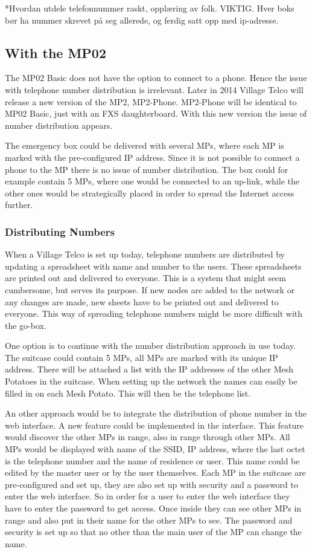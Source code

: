 *Hvordan utdele telefonnummer raskt, opplæring av folk. VIKTIG. Hver boks bør ha nummer skrevet på seg allerede, og ferdig satt opp med ip-adresse. 


\subsection{With the MP02}
The MP02 Basic does not have the option to connect to a phone. Hence the issue with telephone number distribution is irrelevant. Later in 2014 Village Telco will release a new version of the MP2, MP2-Phone. MP2-Phone will be identical to MP02 Basic, just with an FXS daughterboard. With this new version the issue of number distribution appears. 

The emergency box could be delivered with several MPs, where each MP is marked with the pre-configured IP address. Since it is not possible to connect a phone to the MP there is no issue of number distribution. The box could for example contain 5 MPs, where one would be connected to an up-link, while the other ones would be strategically placed in order to spread the Internet access further. 

\subsubsection{Distributing Numbers}
When a Village Telco is set up today, telephone numbers are distributed by updating a spreadsheet with name and number to the users. These spreadsheets are printed out and delivered to everyone. This is a system that might seem cumbersome, but serves its purpose. If new nodes are added to the network or any changes are made, new sheets have to be printed out and delivered to everyone. This way of spreading telephone numbers might be more difficult with the go-box. 

One option is to continue with the number distribution approach in use today. The suitcase could contain 5 MPs, all MPs are marked with its unique IP address. There will be attached a list with the IP addresses of the other Mesh Potatoes in the suitcase. When setting up the network the names can easily be filled in on each Mesh Potato. This will then be the telephone list.  

An other approach would be to integrate the distribution of phone number in the web interface. A new feature could be implemented in the interface. This feature would discover the other MPs in range, also in range through other MPs. All MPs would be displayed with name of the SSID, IP address, where the last octet is the telephone number and the name of residence or user. This name could be edited by the master user or by the user themselves. Each MP in the suitcase are pre-configured and set up, they are also set up with security and a password to enter the web interface. So in order for a user to enter the web interface they have to enter the password to get access. Once inside they can see other MPs in range and also put in their name for the other MPs to see. The password and security is set up so that no other than the main user of the MP can change the name. 


